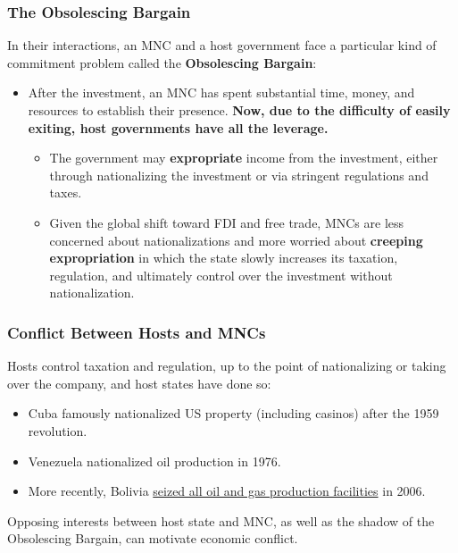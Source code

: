 \documentclass{beamer}
\begin{document}
\begin{frame} 
	\frametitle{\LARGE{The Obsolescing Bargain}}
	In their interactions, an MNC and a host government face a particular kind of commitment problem called the \textbf{Obsolescing Bargain}:
	\begin{itemize}
		\item After the investment, an MNC has spent substantial time, money, and resources to establish their presence. \textbf{Now, due to the difficulty of easily exiting, host governments have all the leverage.} \pause 
		\begin{itemize}
			\item The government may \textbf{expropriate} income from the investment, either through nationalizing the investment or via stringent regulations and taxes. \pause
			\item Given the global shift toward FDI and free trade, MNCs are less concerned about nationalizations and more worried about \textbf{creeping expropriation} in which the state slowly increases its taxation, regulation, and ultimately control over the investment without nationalization.
		\end{itemize}
	\end{itemize}
	
\end{frame}



\begin{frame} 
	\frametitle{\LARGE{Conflict Between Hosts and MNCs}}
	\begin{itemize}
		\large{
			\item Hosts control taxation and regulation, up to the point of nationalizing or taking over the company, and host states have done so: \pause 
			\begin{itemize}
				\item Cuba famously nationalized US property (including casinos) after the 1959 revolution. \pause 
				\item Venezuela nationalized oil production in 1976. \pause
				\item More recently, Bolivia \href{https://www.cfr.org/backgrounder/bolivias-nationalization-oil-and-gas}{seized all oil and gas production facilities} in 2006.
			\end{itemize}
			\item Opposing interests between host state and MNC, as well as the shadow of the Obsolescing Bargain, can motivate economic conflict.
		}
	\end{itemize}
\end{frame}
\end{document}
